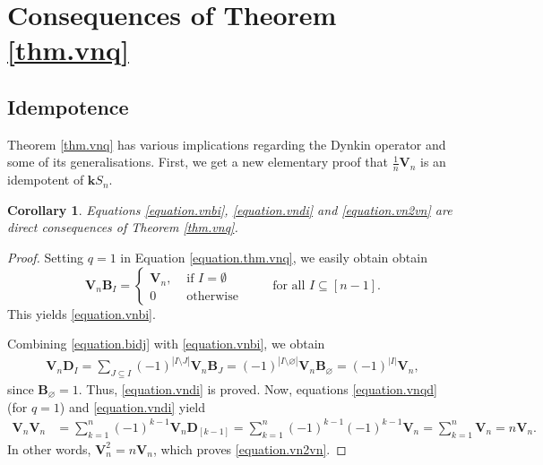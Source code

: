 \documentclass[revision]{FPSAC2025}
\newtheorem{corollary}{Corollary}
\newcommand{\VV}{\mathbf{V}} %
\newcommand{\BB}{\mathbf{B}} %
\newcommand{\DD}{\mathbf{D}} %
\newenvironment{verlong}{}{}
\newenvironment{vershort}{}{}
\begin{document}

\section{Consequences of Theorem \ref{thm.vnq}}
\subsection{Idempotence}
Theorem \ref{thm.vnq} has various implications regarding the Dynkin operator and some of its generalisations. First, we get a new elementary proof that $\frac{1}{n}\mathbf{V}_n$ is an idempotent of $\mathbf{k}S_n$. 
%
\begin{corollary}
Equations \eqref{equation.vnbi}, \eqref{equation.vndi} and \eqref{equation.vn2vn} are direct consequences of Theorem \ref{thm.vnq}.
\end{corollary}
\begin{proof}
Setting $q=1$ in Equation \eqref{equation.thm.vnq}, we
\begin{vershort}
easily obtain
\end{vershort}
\begin{verlong}
obtain
\begin{equation*}
\mathbf{V}_n\mathbf{B}_I
= \begin{cases} \mathbf{V}_n, & \text{ if } I=\emptyset \\ 0 & \text{ otherwise}\end{cases}
\qquad \text{ for all } I \subseteq [n-1].
\end{equation*}
This yields
\end{verlong}
\eqref{equation.vnbi}.

Combining \eqref{equation.bidj} with \eqref{equation.vnbi}, we obtain
\begin{align*}
\VV_n \DD_I = \sum_{J \subseteq I}(-1)^{|I \setminus J|}\VV_n \BB_J
= (-1)^{|I \setminus \varnothing|}\VV_n \BB_\varnothing
= (-1)^{|I|}\VV_n,
\end{align*}
since $\BB_\varnothing = 1$.
Thus, \eqref{equation.vndi} is proved. Now, equations \eqref{equation.vnqd} (for $q=1$) and \eqref{equation.vndi} yield
\begin{align*}
\mathbf{V}_n\mathbf{V}_n &= \sum_{k=1}^n (-1)^{k-1} \VV_n \mathbf{D}_{[k-1]}
= \sum_{k=1}^n (-1)^{k-1} (-1)^{k-1} \VV_n
= \sum_{k=1}^n \VV_n
= n \VV_n .
\end{align*}
In other words, $\mathbf{V}_n^2 = n\mathbf{V}_n$, which proves \eqref{equation.vn2vn}.
\end{proof}
%
\end{document}
